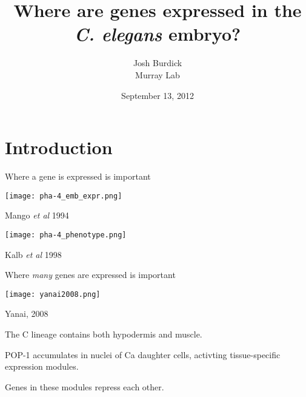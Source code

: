 \documentclass[serif,9pt]{beamer}
\title{Where are genes expressed in the {\em C. elegans} embryo?}
\author{Josh Burdick \\ Murray Lab}
\date{September 13, 2012}
\begin{document}
\begin{frame}
\titlepage
\end{frame}

\begin{frame}
\tableofcontents
\end{frame}

\section{Introduction}

\begin{frame}{Where a gene is expressed is important}

\begin{minipage}{0.27\textwidth}
\texttt{[image: pha-4\_emb\_expr.png]}

\hfill {\footnotesize Mango {\em et al} 1994}
\end{minipage}
\pause
\hspace{0.01\textwidth}
\begin{minipage}{0.7\textwidth}
\texttt{[image: pha-4\_phenotype.png]}

\hfill {\footnotesize Kalb {\em et al} 1998}
\end{minipage}

\end{frame}

\begin{frame}{Where {\em many} genes are expressed is important}

\begin{minipage}{0.7\textwidth}
\texttt{[image: yanai2008.png]}

\hfill Yanai, 2008

\end{minipage}
\hspace{0.01\textwidth}
\begin{minipage}{0.27\textwidth}

\begin{itemize}
{\small
\item The C lineage contains both hypodermis and muscle.

\pause
\item POP-1 accumulates in nuclei of Ca daughter cells, activting
tissue-specific expression modules.

\pause
\item Genes in these modules repress each other.
}
\end{itemize}

\end{minipage}

\end{frame}
\end{document}
